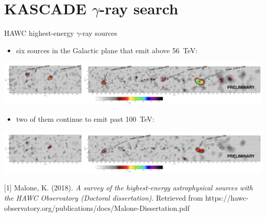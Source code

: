 \section{KASCADE \texorpdfstring{$\gamma$}{gamma}-ray search}

\begin{frame}{HAWC highest-energy $\gamma$-ray sources}

\begin{itemize}
  \item six sources in the Galactic plane that emit above 56~TeV:
\end{itemize}
\includegraphics[width=1\textwidth]{pics/HWC_above_56TeV.png}
\begin{itemize}
  \item two of them continue to emit past 100~TeV:
\end{itemize}
\includegraphics[width=1\textwidth]{pics/HWC_above_100TeV.png}

\small
[1] Malone, K. (2018). \textit{A survey of the highest-energy astrophysical sources with the HAWC Observatory (Doctoral dissertation)}.
Retrieved from https://hawc-observatory.org/publications/docs/Malone-Dissertation.pdf

\end{frame}

